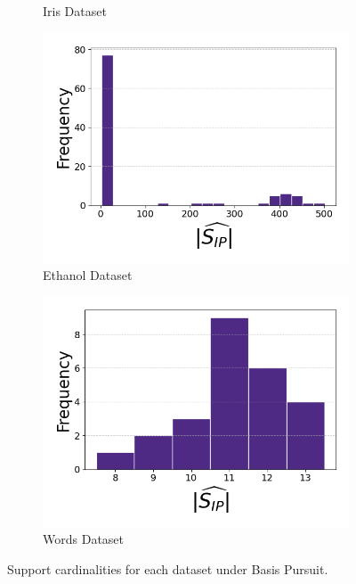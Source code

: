 \begin{figure}[t]
\begin{subfigure}[b]{0.45\textwidth}
        \caption{Iris Dataset}
        \label{fig:iris_cardinalities}
    \end{subfigure}

    \vspace{0.5em}  %

    \begin{subfigure}[b]{0.45\textwidth}
        \centering
        \includegraphics[width=\textwidth]{../figures/ethanol_cardinalities}
        \caption{Ethanol Dataset}
        \label{fig:ethanol_cardinalities}
    \end{subfigure}
    \hfill
    \begin{subfigure}[b]{0.45\textwidth}
        \centering
        \includegraphics[width=\textwidth]{../figures/words_cardinalities}
        \caption{Words Dataset}
        \label{fig:words_cardinalities}
    \end{subfigure}

    \caption{Support cardinalities for each dataset under Basis Pursuit.}
    \label{fig:support_cardinalities}
\end{figure}



